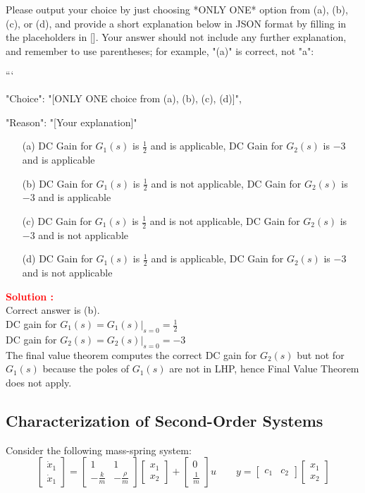 \documentclass[12pt]{article}
\newcommand{\bmat}[1]{\begin{bmatrix} #1 \end{bmatrix}}
\begin{document}
Please output your choice by just choosing *ONLY ONE* option from (a), (b), (c), or (d), and provide a short explanation below in JSON format by filling in the placeholders in []. Your answer should not include any further explanation, and remember to use parentheses; for example, "(a)" is correct, not "a":

```
{

"Choice": "[ONLY ONE choice from (a), (b), (c), (d)]",

"Reason": "[Your explanation]"

}

\begin{itemize}
    \item[(a)] DC Gain for \(G_1(s)\) is \(\frac{1}{2}\) and is applicable, DC Gain for \(G_2(s)\) is \(-3\) and is  applicable
    \item[(b)] DC Gain for \(G_1(s)\) is \(\frac{1}{2}\) and is not applicable, DC Gain for \(G_2(s)\) is \(-3\) and is  applicable
    \item[(c)] DC Gain for \(G_1(s)\) is \(\frac{1}{2}\) and is not applicable, DC Gain for \(G_2(s)\) is \(-3\) and is not applicable
    \item[(d)] DC Gain for \(G_1(s)\) is \(\frac{1}{2}\) and is applicable, DC Gain for \(G_2(s)\) is \(-3\) and is not applicable
\end{itemize}

\textbf{\textcolor{red}{Solution :}} \\
Correct answer is (b).\\
DC gain for $G_1(s) = G_1(s)|_{s=0} =\frac{1}{2}$ \\
DC gain for $G_2(s) = G_2(s)|_{s=0} = -3$ \\
The final value theorem computes the correct DC gain for $G_2(s)$ but not for $G_1(s)$ because the poles of $G_1(s)$ are not in LHP, hence Final Value Theorem does not apply.

\clearpage
\subsection{Characterization of Second-Order Systems}

Consider the following mass-spring system:
\[
\bmat{\dot{x}_1 \\ \dot{x}_1} = \bmat{1 & 1 \\ -\frac{k}{m} & -\frac{\rho}{m}}\bmat{x_1 \\ x_2} +\bmat{0 \\ \frac{1}{m}}u \qquad y=\bmat{c_1 & c_2} \bmat{x_1 \\ x_2}
\]
\end{document}
